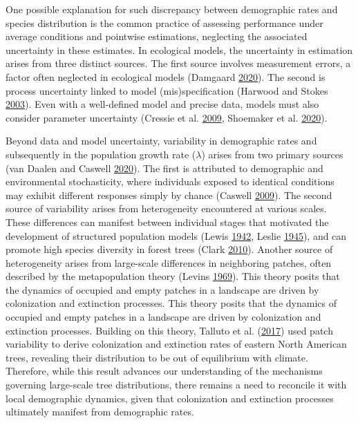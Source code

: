 \documentclass[12pt]{article}
\begin{document}
One possible explanation for such discrepancy between demographic rates
and species distribution is the common practice of assessing performance
under average conditions and pointwise estimations, neglecting the
associated uncertainty in these estimates. In ecological models, the
uncertainty in estimation arises from three distinct sources. The first
source involves measurement errors, a factor often neglected in
ecological models (Damgaard \protect\hyperlink{ref-Damgaard2020}{2020}).
The second is process uncertainty linked to model (mis)specification
(Harwood and Stokes \protect\hyperlink{ref-Harwood2003}{2003}). Even
with a well-defined model and precise data, models must also consider
parameter uncertainty (Cressie et al.
\protect\hyperlink{ref-Cressie2009}{2009}, Shoemaker et al.
\protect\hyperlink{ref-Shoemaker2020}{2020}).

Beyond data and model uncertainty, variability in demographic rates and
subsequently in the population growth rate (\(\lambda\)) arises from two
primary sources (van Daalen and Caswell
\protect\hyperlink{ref-van2020}{2020}). The first is attributed to
demographic and environmental stochasticity, where individuals exposed
to identical conditions may exhibit different responses simply by chance
(Caswell \protect\hyperlink{ref-Caswell2009}{2009}). The second source
of variability arises from heterogeneity encountered at various scales.
These differences can manifest between individual stages that motivated
the development of structured population models (Lewis
\protect\hyperlink{ref-Lewis1942}{1942}, Leslie
\protect\hyperlink{ref-leslie1945}{1945}), and can promote high species
diversity in forest trees (Clark
\protect\hyperlink{ref-Clark2010}{2010}). Another source of
heterogeneity arises from large-scale differences in neighboring
patches, often described by the metapopulation theory (Levins
\protect\hyperlink{ref-Levins1969}{1969}). This theory posits that the
dynamics of occupied and empty patches in a landscape are driven by
colonization and extinction processes. This theory posits that the
dynamics of occupied and empty patches in a landscape are driven by
colonization and extinction processes. Building on this theory, Talluto
et al. (\protect\hyperlink{ref-Talluto2017}{2017}) used patch
variability to derive colonization and extinction rates of eastern North
American trees, revealing their distribution to be out of equilibrium
with climate. Therefore, while this result advances our understanding of
the mechanisms governing large-scale tree distributions, there remains a
need to reconcile it with local demographic dynamics, given that
colonization and extinction processes ultimately manifest from
demographic rates.
\end{document}
